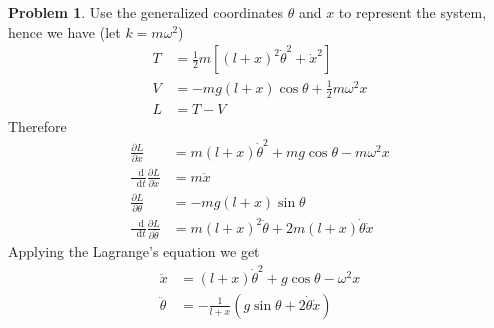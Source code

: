 \documentclass[twoside,11pt]{article}
\renewcommand*\d{\mathop{}\!\mathrm{d}}
\theoremstyle{definition}
\newtheorem{problem}{Problem}
\theoremstyle{remark}
\begin{document}
\begin{problem}
Use the generalized coordinates $\theta$ and $x$ to represent the system,
hence we have
(let $k=m\omega^2$)
\begin{align*}
    T &= \frac{1}{2}m[(l+x)^2\dot{\theta}^2 + \dot{x}^2]\\
    V &= -mg(l+x)\cos\theta + \frac{1}{2}m\omega^2 x\\
    L &= T - V
\end{align*}
Therefore
\begin{align*}
    \frac{\partial L}{\partial x} &=
    m(l+x)\dot{\theta}^2 + mg\cos\theta - m\omega^2x\\
    \frac{\d}{\d t}\frac{\partial L}{\partial \dot{x}} &= 
    m\ddot{x}\\
    \frac{\partial L}{\partial\theta} &=
    -mg(l+x)\sin\theta\\
    \frac{\d}{\d t}\frac{\partial L}{\partial\dot{\theta}} &= 
    m(l+x)^2\ddot{\theta} + 2m(l+x)\dot{\theta}\dot{x}
\end{align*}
Applying the Lagrange's equation we get 
\begin{align*}
    \ddot{x} &=
    (l+x)\dot{\theta}^2 + g\cos\theta - \omega^2 x\\
    \ddot{\theta} &= 
    -\frac{1}{l+x}(g\sin\theta + 2\dot{\theta}\dot{x})
\end{align*}

\end{problem}


\end{document}

